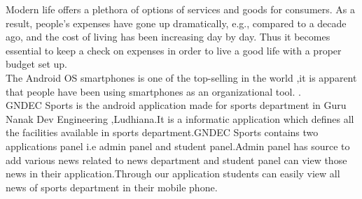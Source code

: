 \begin{Large}
\end{Large}
\vskip 0.1in Modern life offers a plethora of options of services and goods for consumers. As a 
result, people's expenses have gone up dramatically, e.g., compared to a decade ago, and the 
cost of living has been increasing day by day. Thus it becomes essential to keep a check on expenses in order to live a good life with a proper budget set up.  \\

\noindent The Android OS smartphones is one of the top-selling  in the world ,it is apparent that people have been using smartphones as an organizational tool. .\\

\noindent GNDEC Sports is the android application made for sports department in Guru Nanak Dev
Engineering ,Ludhiana.It is a informatic application which defines all the facilities available
in sports department.GNDEC Sports contains two applications panel i.e admin panel and
student panel.Admin panel has source to add various news related to news department and
student panel can view those news in their application.Through our application students can
easily view all news of sports department in their mobile phone.